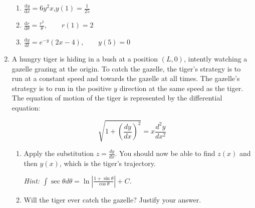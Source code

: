 \begin{enumerate}
\begin{enumerate}
    \item $\frac{\mathrm d y}{\mathrm d x} = 6y^2x$,\qquad $y(1) = \frac{1}{25}$

    \item $\frac{\mathrm d r}{\mathrm d \theta} = \frac{r^2}{\theta},\qquad r(1) = 2 $  

    \item $\frac{\mathrm d y}{\mathrm d t} = e^{-y}(2x-4),\qquad y(5)=0$ 
\end{enumerate}

\item 
A hungry tiger is hiding in a bush at a position $(L, 0)$, intently watching a gazelle grazing at the origin. To catch the gazelle, the tiger's strategy is to run at a constant speed and towards the gazelle at all times. The gazelle's strategy is to run in the positive $y$ direction at the same speed as the tiger. The equation of motion of the tiger is represented by the differential equation:
	
	\[
	    \sqrt{1+\left(\frac{dy}{dx}\right)^2} = x\frac{d^2y}{dx^2}
	\]
\begin{enumerate}
	    \item Apply the substitution $z=\frac{dy}{dx}$. You should now be able to find $z(x)$ and then $y(x)$, which is the tiger's trajectory.
	    
	    \textit{Hint: $\int\sec{\theta}d\theta = \ln\left|\frac{1+\sin\theta}{\cos\theta}\right| + C$.}
    \item Will the tiger ever catch the gazelle? Justify your answer.

\end{enumerate}
\end{enumerate}